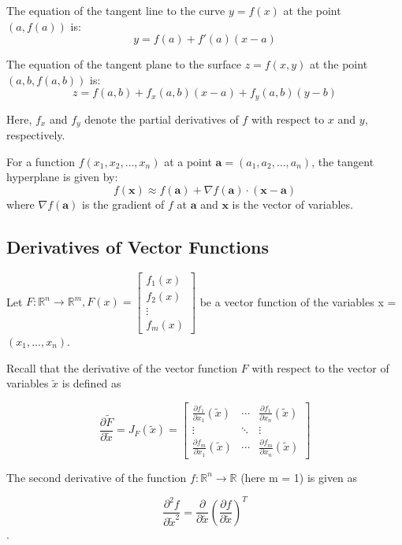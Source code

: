 \documentclass{article}
\begin{document}
\begin{multicols}{2}
The equation of the tangent line to the curve \( y = f(x) \) at the point \( (a, f(a)) \) is:
\[
y = f(a) + f'(a)(x - a)
\]

The equation of the tangent plane to the surface \( z = f(x, y) \) at the point \( (a, b, f(a, b)) \) is:
\[
z = f(a, b) + f_x(a, b)(x - a) + f_y(a, b)(y - b)
\]

Here, \( f_x \) and \( f_y \) denote the partial derivatives of \( f \) with respect to \( x \) and \( y \), respectively.

For a function \( f(x_1, x_2, \ldots, x_n) \) at a point \( \mathbf{a} = (a_1, a_2, \ldots, a_n) \), the tangent hyperplane is given by:
\[
f(\mathbf{x}) \approx f(\mathbf{a}) + \nabla f(\mathbf{a}) \cdot (\mathbf{x} - \mathbf{a})
\]
where \( \nabla f(\mathbf{a}) \) is the gradient of \( f \) at \( \mathbf{a} \) and \( \mathbf{x} \) is the vector of variables.

\subsection{Derivatives of Vector Functions}
Let \( F: \mathbb{R}^n \rightarrow \mathbb{R}^m, F(x) = 
\begin{bmatrix}
    f_1(x) \\
    f_2(x) \\
    \vdots \\
    f_m(x)
\end{bmatrix} \)
be a vector function of the variables x = \( (x_1, ..., x_n) \).

Recall that the derivative of the vector function \( F \) with respect to the vector of variables \( \tilde{x} \) is defined as

\[ \frac{\partial \tilde{F}}{\partial \tilde{x}} = J_F(\tilde{x}) = \begin{bmatrix}    \frac{\partial f_1}{\partial x_1} (\tilde{x}) & \cdots & \frac{\partial f_1}{\partial x_n} (\tilde{x}) \\    \vdots & \ddots & \vdots \\    \frac{\partial f_m}{\partial x_1} (\tilde{x}) & \cdots & \frac{\partial f_m}{\partial x_n} (\tilde{x})\end{bmatrix}\]

The second derivative of the function \( f: \mathbb{R}^n \rightarrow \mathbb{R} \) (here m = 1) is given as

\[ \frac{\partial^2 f}{\partial \tilde{x}^2} = \frac{\partial}{\partial \tilde{x}} \left( \frac{\partial f}{\partial \tilde{x}} \right)^T \].


\end{multicols}
\end{document}
